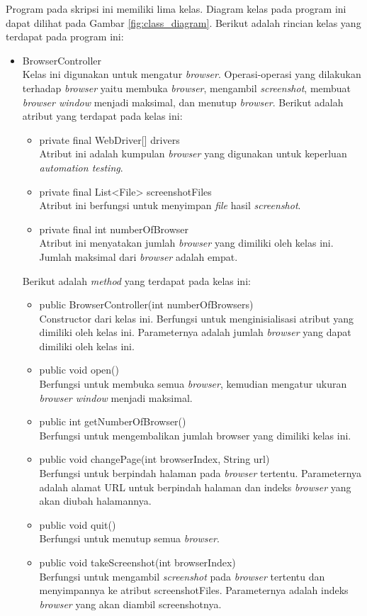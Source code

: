 Program pada skripsi ini memiliki lima kelas. Diagram kelas pada program ini dapat dilihat pada Gambar \ref{fig:class_diagram}. Berikut adalah rincian kelas yang terdapat pada program ini:
\begin{itemize}
\item BrowserController\\
Kelas ini digunakan untuk mengatur \textit{browser}. Operasi-operasi yang dilakukan terhadap \textit{browser} yaitu membuka \textit{browser}, mengambil \textit{screenshot}, membuat \textit{browser window} menjadi maksimal, dan menutup \textit{browser}. Berikut adalah atribut yang terdapat pada kelas ini:
\begin{itemize}
   \item private final WebDriver[] drivers\\
   Atribut ini adalah kumpulan \textit{browser} yang digunakan untuk keperluan \textit{automation testing}. 
    \item private final List<File> screenshotFiles\\
	Atribut ini berfungsi untuk menyimpan \textit{file} hasil \textit{screenshot}.
	\item  private final int numberOfBrowser\\
	Atribut ini menyatakan jumlah \textit{browser} yang dimiliki oleh kelas ini. Jumlah maksimal dari \textit{browser} adalah empat.
\end{itemize}

Berikut adalah \textit{method} yang terdapat pada kelas ini:
\begin{itemize}
\item public BrowserController(int numberOfBrowsers)\\
Constructor dari kelas ini. Berfungsi untuk menginisialisasi atribut yang dimiliki oleh kelas ini. Parameternya adalah jumlah \textit{browser} yang dapat dimiliki oleh kelas ini.
  \item public void open()\\
  Berfungsi untuk membuka semua \textit{browser}, kemudian mengatur ukuran \textit{browser window} menjadi maksimal. 
  \item public int getNumberOfBrowser()\\
  Berfungsi untuk mengembalikan jumlah browser yang dimiliki kelas ini.
  \item public void changePage(int browserIndex, String url)\\
  Berfungsi untuk berpindah halaman pada \textit{browser} tertentu. Parameternya adalah alamat URL untuk berpindah halaman dan indeks \textit{browser} yang akan diubah halamannya.
  \item public void quit()\\
  Berfungsi untuk menutup semua \textit{browser}.
  \item public void takeScreenshot(int browserIndex)\\
  Berfungsi untuk mengambil \textit{screenshot} pada \textit{browser} tertentu dan menyimpannya ke atribut screenshotFiles. Parameternya adalah indeks \textit{browser} yang akan diambil screenshotnya.
\end{itemize}


\end{itemize}
